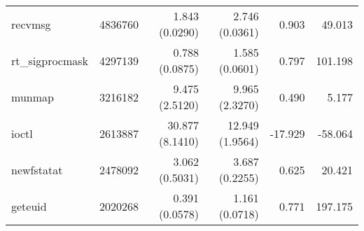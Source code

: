 \begin{tabular}{>{\ttfamily}lrrrrr}
                        recvmsg &    4836760 &           1.843 (0.0290) &           2.746 (0.0361) &           0.903 &       49.013 \\
                rt\_sigprocmask &    4297139 &           0.788 (0.0875) &           1.585 (0.0601) &           0.797 &      101.198 \\
                         munmap &    3216182 &           9.475 (2.5120) &           9.965 (2.3270) &           0.490 &        5.177 \\
                          ioctl &    2613887 &          30.877 (8.1410) &          12.949 (1.9564) &         -17.929 &      -58.064 \\
                     newfstatat &    2478092 &           3.062 (0.5031) &           3.687 (0.2255) &           0.625 &       20.421 \\
                        geteuid &    2020268 &           0.391 (0.0578) &           1.161 (0.0718) &           0.771 &      197.175 \\
\bottomrule
\end{tabular}
